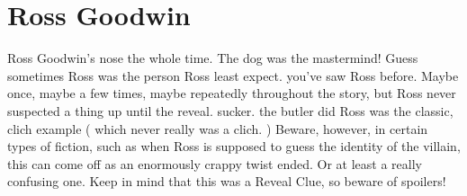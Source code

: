 \documentclass[12pt]{book}
\begin{document}
\chapter{Ross Goodwin}

Ross Goodwin's nose the whole time. The dog was the mastermind! Guess sometimes Ross was the person Ross least expect. you've saw Ross before. Maybe once, maybe a few times, maybe repeatedly throughout the story, but Ross never suspected a thing up until the reveal. sucker. the butler did Ross was the classic, clich example ( which never really was a clich. ) Beware, however, in certain types of fiction, such as when Ross is supposed to guess the identity of the villain, this can come off as an enormously crappy twist ended. Or at least a really confusing one. Keep in mind that this was a Reveal Clue, so beware of spoilers!
\end{document}
